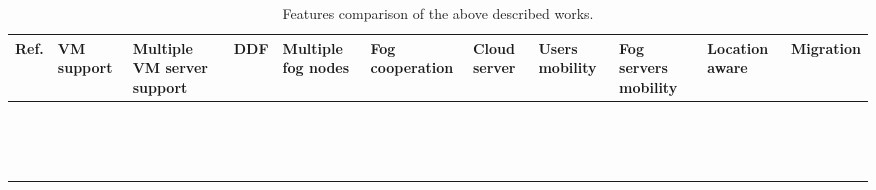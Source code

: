\begin{table}
	\caption{Features comparison of the above described works.}
	\scriptsize
	\begin{tabular}{
			>{\arraybackslash}m{0.32in}
			>{\centering\arraybackslash}m{0.41in}
			>{\centering\arraybackslash}m{0.41in} >{\centering\arraybackslash}m{0.41in} >{\centering\arraybackslash}m{0.41in}
			>{\centering\arraybackslash}m{0.41in}
			>{\centering\arraybackslash}m{0.41in}
			>{\centering\arraybackslash}m{0.41in} >{\centering\arraybackslash}m{0.41in}
			>{\centering\arraybackslash}m{0.41in} >{\centering\arraybackslash}m{0.41in}
		}
		\toprule
		Ref. &
		VM support&
		Multiple VM server support&
		DDF&
		Multiple fog nodes&
		Fog cooperation&
		Cloud server&
		Users mobility&
		Fog servers mobility&
		Location aware&
		Migration\\
		\toprule
		\cite{rodrigues2017pso} & \cmark & \cmark & & \cmark & \cmark & & & & \cmark & \cmark \\
		\midrule
		\cite{sun2016primal} & \cmark & \cmark & & \cmark & \cmark & & \cmark & & \cmark & \cmark \\
		\midrule
		\cite{ottenwalder2013migcep} & \cmark & \cmark & \cmark & \cmark & \cmark & \cmark & \cmark & & \cmark & \cmark \\
		\midrule
		\cite{zhang2016segue} & \cmark & \cmark & & \cmark & \cmark & & \cmark & & \cmark & \cmark \\
		\midrule
		\cite{deng2016optimal} & & & & \cmark & & \cmark & & & & \\
		\midrule
		\cite{xiao2017qoe} & & & & \cmark & \cmark & \cmark & & & & \\
		\midrule
		\cite{gu2017cost} & \cmark & \cmark & & \cmark & \cmark & & & & \cmark & \\
		\midrule
		\cite{skarlat2017optimized} & \cmark & \cmark & \cmark & \cmark & \cmark & \cmark & & & & \\
		\midrule
		\cite{bahreini2017efficient} & \cmark & & \cmark & \cmark & \cmark & \cmark & \cmark & & \cmark & \cmark \\
		\midrule
		\cite{ye2016scalable} & \cmark & \cmark & & \cmark & \cmark & & & \cmark & \cmark & \\
		\midrule
		\cite{nan2017adaptive} & & & & \cmark & & \cmark & & & & \\
		\midrule
		\cite{yang2016cost} & \cmark & \cmark & & \cmark & \cmark & \cmark & \cmark & & \cmark & \cmark \\
		\midrule
		\cite{wang2018service} & \cmark & \cmark & & \cmark & \cmark & & \cmark & & \cmark & \cmark \\
		\midrule
		\cite{liu2018multiobjective} & & & & & & \cmark & & & & \\
		\midrule
		\cite{wang2018moera} & \cmark & \cmark & & \cmark & \cmark & & \cmark & & \cmark & \cmark \\
		\bottomrule
	\end{tabular}
	\label{tab:literature:features}
\end{table}
